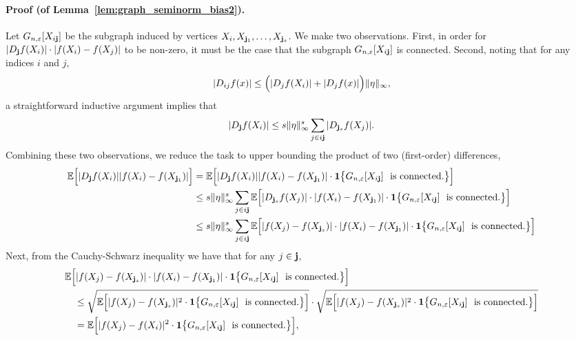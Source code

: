 \documentclass[aos]{imsart}
\theoremstyle{plain}
\theoremstyle{definition}
\theoremstyle{remark}
\newcommand{\1}{\mathbf{1}}
\newcommand{\bj}{{\bf j}}
\begin{document}
\paragraph{Proof (of Lemma~\ref{lem:graph_seminorm_bias2}).}
Let $G_{n,\varepsilon}[X_{i\bj}]$ be the subgraph induced by vertices $X_i, X_{\bj_1},\ldots,X_{\bj_s}$. We make two observations. First, in order for $|D_{\bj}f(X_i)| \cdot |f(X_i)  - f(X_j)|$ to be non-zero, it must be the case that the subgraph $G_{n,\varepsilon}[X_{i\bj}]$ is connected. Second, noting that for any indices $i$ and $j$,
\begin{equation*}
|D_{ij}f(x)| \leq \Bigl(|D_jf(X_i)| + |D_jf(x)|\Bigr)\|\eta\|_{\infty}, 
\end{equation*}
a straightforward inductive argument implies that 
\begin{equation*}
|D_{\bj}f(X_i)| \leq s\|\eta\|_{\infty}^s \sum_{j \in i\bj} |D_{\bj_s}f(X_j)|.
\end{equation*}
Combining these two observations, we reduce the task to upper bounding the product of two (first-order) differences,
\begin{align*}
\mathbb{E}\Bigl[ |D_{\bj}f(X_i)| |f(X_i) - f(X_{\bj_1})| \Bigr] & = \mathbb{E}\Bigl[ |D_{\bj}f(X_i)| |f(X_i) - f(X_{\bj_1})| \cdot \1\bigl\{G_{n,\varepsilon}[X_{i\bj}]~~\textrm{is connected.} \bigr\} \Bigr] \\
& \leq s\|\eta\|_{\infty}^s \sum_{j \in i\bj} \mathbb{E}\Bigl[ |D_{\bj_s}f(X_j)| \cdot |f(X_i) - f(X_{\bj_1})| \cdot \1\bigl\{G_{n,\varepsilon}[X_{i\bj}]~~\textrm{is connected.} \bigr\}   \Bigr] \\
& \leq s\|\eta\|_{\infty}^s \sum_{j \in i\bj} \mathbb{E}\Bigl[ |f(X_j) - f(X_{\bj_s})| \cdot |f(X_i) - f(X_{\bj_1})| \cdot \1\bigl\{G_{n,\varepsilon}[X_{i\bj}]~~\textrm{is connected.} \bigr\}   \Bigr] 
\end{align*}
Next, from the Cauchy-Schwarz inequality we have that for any $j \in \bj$,
\begin{align*}
& \mathbb{E}\Bigl[ |f(X_j) - f(X_{\bj_s})| \cdot |f(X_i) - f(X_{\bj_1})| \cdot \1\bigl\{G_{n,\varepsilon}[X_{i\bj}]~~\textrm{is connected.} \bigr\}   \Bigr] \\
& \quad \leq \sqrt{\mathbb{E}\Bigl[ |f(X_j) - f(X_{\bj_s})|^2 \cdot \1\bigl\{G_{n,\varepsilon}[X_{i\bj}]~~\textrm{is connected.} \bigr\} \Bigr]} \cdot \sqrt{\mathbb{E}\Bigl[ |f(X_j) - f(X_{\bj_s})|^2 \cdot \1\bigl\{G_{n,\varepsilon}[X_{i\bj}]~~\textrm{is connected.} \bigr\} \Bigr]} \\
& \quad = \mathbb{E}\Bigl[ |f(X_j) - f(X_{i})|^2 \cdot \1\bigl\{G_{n,\varepsilon}[X_{i\bj}]~~\textrm{is connected.} \bigr\} \Bigr],
\end{align*}
\end{document}
